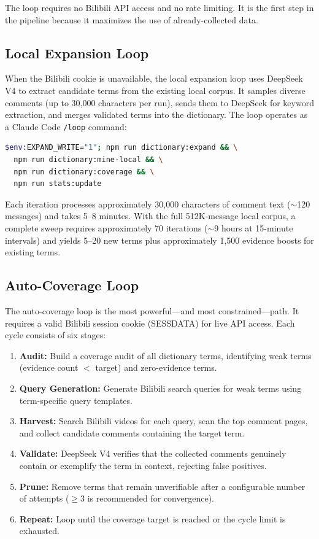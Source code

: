 \documentclass[11pt,a4paper]{article}
\begin{document}
The loop requires no Bilibili API access and no rate limiting. It is the first
step in the pipeline because it maximizes the use of already-collected data.

\subsection{Local Expansion Loop}

When the Bilibili cookie is unavailable, the local expansion loop uses DeepSeek V4
to extract candidate terms from the existing local corpus. It samples diverse
comments (up to 30,000 characters per run), sends them to DeepSeek for keyword
extraction, and merges validated terms into the dictionary. The loop operates as
a Claude Code \texttt{/loop} command:

\begin{lstlisting}[language=bash,caption={Local expansion loop command.}]
$env:EXPAND_WRITE="1"; npm run dictionary:expand && \
  npm run dictionary:mine-local && \
  npm run dictionary:coverage && \
  npm run stats:update
\end{lstlisting}

Each iteration processes approximately 30,000 characters of comment text
($\sim$120 messages) and takes 5--8 minutes. With the full 512K-message local
corpus, a complete sweep requires approximately 70 iterations ($\sim$9 hours
at 15-minute intervals) and yields 5--20 new terms plus approximately 1,500
evidence boosts for existing terms.

\subsection{Auto-Coverage Loop}

The auto-coverage loop is the most powerful---and most constrained---path.
It requires a valid Bilibili session cookie (SESSDATA) for live API access.
Each cycle consists of six stages:

\begin{enumerate}
  \item \textbf{Audit:} Build a coverage audit of all dictionary terms, identifying
    weak terms (evidence count $<$ target) and zero-evidence terms.
  \item \textbf{Query Generation:} Generate Bilibili search queries for weak terms
    using term-specific query templates.
  \item \textbf{Harvest:} Search Bilibili videos for each query, scan the top
    comment pages, and collect candidate comments containing the target term.
  \item \textbf{Validate:} DeepSeek V4 verifies that the collected comments
    genuinely contain or exemplify the term in context, rejecting false positives.
  \item \textbf{Prune:} Remove terms that remain unverifiable after a configurable
    number of attempts ($\geq 3$ is recommended for convergence).
  \item \textbf{Repeat:} Loop until the coverage target is reached or the cycle
    limit is exhausted.
\end{enumerate}
\end{document}
